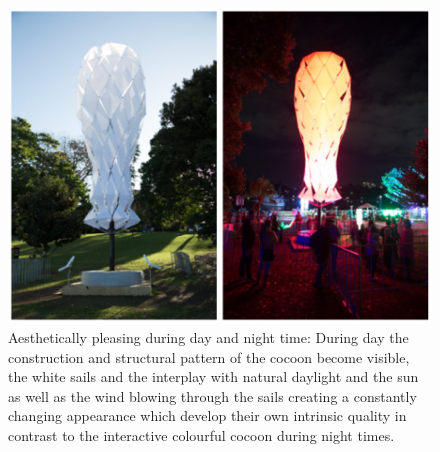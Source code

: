 \begin{figure}[!h] 
\centering
\includegraphics[width=\textwidth]{Illustrations/VIVID_daynight.png}
\caption [Day versus Night aspects of Media Architecture (VIVID)] {Aesthetically pleasing during day and night time: During day the construction and structural pattern of the cocoon become visible, the white sails and the interplay with natural daylight and the sun as well as the wind blowing through the sails creating a constantly changing appearance which develop their own intrinsic quality in contrast to the interactive colourful cocoon during night times. }
\label{RIGAdaynight}
\end{figure}





